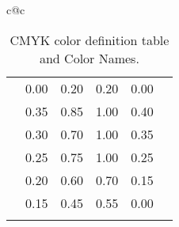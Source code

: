 \begin{table}[!ht]
\begin{center}
\begin{scriptsize}
\begin{tabular}{c@{\quad}c}
\begin{tabular}{|c|c|cccc|}
      \clrow{verylightred}             & 0.00 & 0.20 & 0.20 & 0.00 \\
      \clspc
      \clrow{verydarkbrown}            & 0.35 & 0.85 & 1.00 & 0.40 \\
      \clrow{darkbrown}                & 0.30 & 0.70 & 1.00 & 0.35 \\
      \clrow{brown}                    & 0.25 & 0.75 & 1.00 & 0.25 \\
      \clrow{lightbrown}               & 0.20 & 0.60 & 0.70 & 0.15 \\
      \clrow{verylightbrown}           & 0.15 & 0.45 & 0.55 & 0.00 \\
      \clspc
      \hline
    \end{tabular}
   \\
  \end{tabular}
\end{scriptsize}
  \caption{\label{tbl:CMYKcolortbl}
    {\prog} CMYK color definition table and Color Names.
    } %
\end{center}
\end{table}
\vfill
